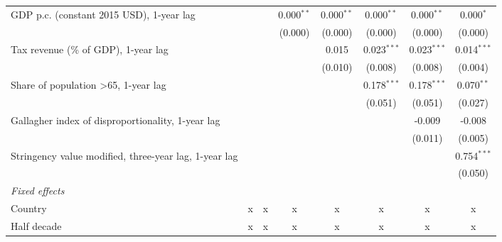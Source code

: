 \begin{table}[htbp]
\begin{tabular}{lccccccc}
      GDP p.c. (constant 2015 USD), 1-year lag                         &               &              & 0.000$^{**}$  & 0.000$^{**}$ & 0.000$^{**}$  & 0.000$^{**}$  & 0.000$^{*}$\\   
                                                                       &               &              & (0.000)       & (0.000)      & (0.000)       & (0.000)       & (0.000)\\   
      Tax revenue (\% of GDP), 1-year lag                              &               &              &               & 0.015        & 0.023$^{***}$ & 0.023$^{***}$ & 0.014$^{***}$\\   
                                                                       &               &              &               & (0.010)      & (0.008)       & (0.008)       & (0.004)\\   
      Share of population >65, 1-year lag                              &               &              &               &              & 0.178$^{***}$ & 0.178$^{***}$ & 0.070$^{**}$\\   
                                                                       &               &              &               &              & (0.051)       & (0.051)       & (0.027)\\   
      Gallagher index of disproportionality, 1-year lag                &               &              &               &              &               & -0.009        & -0.008\\   
                                                                       &               &              &               &              &               & (0.011)       & (0.005)\\   
      Stringency value modified, three-year lag, 1-year lag            &               &              &               &              &               &               & 0.754$^{***}$\\   
                                                                       &               &              &               &              &               &               & (0.050)\\   
      \emph{Fixed effects}\\
      Country                                                          & x             & x            & x             & x            & x             & x             & x\\  
      Half decade                                                      & x             & x            & x             & x            & x             & x             & x\\  

\end{tabular}
\end{table}
